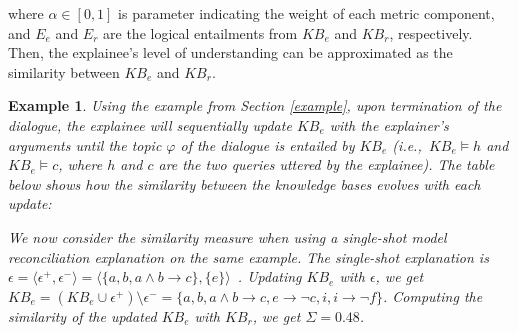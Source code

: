 \documentclass{ecai}
\newtheorem{example}{\bf Example}
\begin{document}
\noindent where $\alpha \in [0,1]$ is parameter indicating the weight of each metric component, and $E_e$ and $E_r$ are the logical entailments from $KB_e$ and $KB_r$, respectively. Then, the explainee's level of understanding can be approximated as the similarity between $KB_e$ and $KB_r$. 

\begin{example}
    Using the example from Section \ref{example}, upon termination of the dialogue, the explainee will sequentially update $KB_e$ with the explainer's arguments until the topic $\varphi$ of the dialogue is entailed by $KB_e$ (i.e.,~$KB_e \models h$ and $KB_e \models c$, where $h$ and $c$ are the two queries uttered by the explainee). The table below shows how the similarity between the knowledge bases evolves with each update:

\begin{table}
\renewcommand{\arraystretch}{1.6}
\setlength{\tabcolsep}{3pt}
\end{table}



\noindent We now consider the similarity measure when using a single-shot model reconciliation explanation on the same example. The single-shot explanation is $\epsilon = \langle \epsilon^+, \epsilon^- \rangle = \langle \{ a, b, a\land b \!\rightarrow\! c \}, \{e\} \rangle$~\cite{vasileioulogic}. Updating $KB_e$ with $\epsilon$, we get $KB_e = (KB_e \cup \epsilon^+)\setminus \epsilon^- = \{a, b, a\land b \!\rightarrow\! c , e\!\rightarrow\! \neg c, i, i \!\rightarrow\! \neg f \}$. Computing the similarity of the updated $KB_e$ with $KB_r$, we get $\Sigma = 0.48$.
\end{example}
\end{document}
